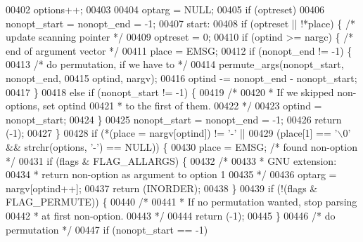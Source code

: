 \begin{DoxyCode}
{{{{{{{00402         options++;
00403 
00404     optarg = NULL;
00405     \textcolor{keywordflow}{if} (optreset)
00406         nonopt_start = nonopt_end = -1;
00407 start:
00408     \textcolor{keywordflow}{if} (optreset || !*place) \{      \textcolor{comment}{/* update scanning pointer */}
00409         optreset = 0;
00410         \textcolor{keywordflow}{if} (optind >= nargc) \{          \textcolor{comment}{/* end of argument vector */}
00411             place = EMSG;
00412             \textcolor{keywordflow}{if} (nonopt_end != -1) \{
00413                 \textcolor{comment}{/* do permutation, if we have to */}
00414                 permute_args(nonopt_start, nonopt_end,
00415                     optind, nargv);
00416                 optind -= nonopt_end - nonopt_start;
00417             \}
00418             \textcolor{keywordflow}{else} \textcolor{keywordflow}{if} (nonopt_start != -1) \{
00419                 \textcolor{comment}{/*}
00420 \textcolor{comment}{                 * If we skipped non-options, set optind}
00421 \textcolor{comment}{                 * to the first of them.}
00422 \textcolor{comment}{                 */}
00423                 optind = nonopt_start;
00424             \}
00425             nonopt_start = nonopt_end = -1;
00426             \textcolor{keywordflow}{return} (-1);
00427         \}
00428         \textcolor{keywordflow}{if} (*(place = nargv[optind]) != \textcolor{charliteral}{'-'} ||
00429             (place[1] == \textcolor{charliteral}{'\(\backslash\)0'} && strchr(options, \textcolor{charliteral}{'-'}) == NULL)) \{
00430             place = EMSG;       \textcolor{comment}{/* found non-option */}
00431             \textcolor{keywordflow}{if} (flags & FLAG_ALLARGS) \{
00432                 \textcolor{comment}{/*}
00433 \textcolor{comment}{                 * GNU extension:}
00434 \textcolor{comment}{                 * return non-option as argument to option 1}
00435 \textcolor{comment}{                 */}
00436                 optarg = nargv[optind++];
00437                 \textcolor{keywordflow}{return} (INORDER);
00438             \}
00439             \textcolor{keywordflow}{if} (!(flags & FLAG_PERMUTE)) \{
00440                 \textcolor{comment}{/*}
00441 \textcolor{comment}{                 * If no permutation wanted, stop parsing}
00442 \textcolor{comment}{                 * at first non-option.}
00443 \textcolor{comment}{                 */}
00444                 \textcolor{keywordflow}{return} (-1);
00445             \}
00446             \textcolor{comment}{/* do permutation */}
00447             \textcolor{keywordflow}{if} (nonopt_start == -1)
}}}}}}}
\end{DoxyCode}
